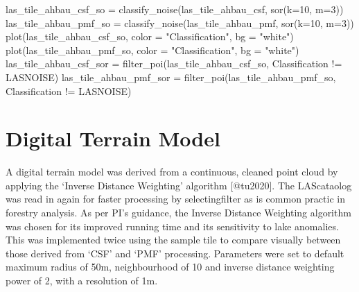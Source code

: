 \documentclass[
]{article}
\newenvironment{Shaded}{\begin{snugshade}}{\end{snugshade}}
\newcommand{\AttributeTok}[1]{\textcolor[rgb]{0.77,0.63,0.00}{#1}}
\newcommand{\DecValTok}[1]{\textcolor[rgb]{0.00,0.00,0.81}{#1}}
\newcommand{\FunctionTok}[1]{\textcolor[rgb]{0.00,0.00,0.00}{#1}}
\newcommand{\NormalTok}[1]{#1}
\newcommand{\OtherTok}[1]{\textcolor[rgb]{0.56,0.35,0.01}{#1}}
\newcommand{\SpecialCharTok}[1]{\textcolor[rgb]{0.00,0.00,0.00}{#1}}
\newcommand{\StringTok}[1]{\textcolor[rgb]{0.31,0.60,0.02}{#1}}
\begin{document}
\begin{Shaded}
\begin{Highlighting}[]
\NormalTok{las\_tile\_ahbau\_csf\_so }\OtherTok{=} \FunctionTok{classify\_noise}\NormalTok{(las\_tile\_ahbau\_csf, }\FunctionTok{sor}\NormalTok{(}\AttributeTok{k=}\DecValTok{10}\NormalTok{, }\AttributeTok{m=}\DecValTok{3}\NormalTok{))}
\NormalTok{las\_tile\_ahbau\_pmf\_so }\OtherTok{=} \FunctionTok{classify\_noise}\NormalTok{(las\_tile\_ahbau\_pmf, }\FunctionTok{sor}\NormalTok{(}\AttributeTok{k=}\DecValTok{10}\NormalTok{, }\AttributeTok{m=}\DecValTok{3}\NormalTok{))}
\FunctionTok{plot}\NormalTok{(las\_tile\_ahbau\_csf\_so, }\AttributeTok{color =} \StringTok{"Classification"}\NormalTok{, }\AttributeTok{bg =} \StringTok{"white"}\NormalTok{) }
\FunctionTok{plot}\NormalTok{(las\_tile\_ahbau\_pmf\_so, }\AttributeTok{color =} \StringTok{"Classification"}\NormalTok{, }\AttributeTok{bg =} \StringTok{"white"}\NormalTok{) }
\NormalTok{las\_tile\_ahbau\_csf\_sor }\OtherTok{=} \FunctionTok{filter\_poi}\NormalTok{(las\_tile\_ahbau\_csf\_so, Classification }\SpecialCharTok{!=}\NormalTok{ LASNOISE)}
\NormalTok{las\_tile\_ahbau\_pmf\_sor }\OtherTok{=} \FunctionTok{filter\_poi}\NormalTok{(las\_tile\_ahbau\_pmf\_so, Classification }\SpecialCharTok{!=}\NormalTok{ LASNOISE)}
\end{Highlighting}
\end{Shaded}

\hypertarget{digital-terrain-model}{%
\section{Digital Terrain Model}\label{digital-terrain-model}}

A digital terrain model was derived from a continuous, cleaned point
cloud by applying the `Inverse Distance Weighting' algorithm
{[}@tu2020{]}. The LAScataolog was read in again for faster processing
by selectingfilter as is common practic in forestry analysis. As per
PI's guidance, the Inverse Distance Weighting algorithm was chosen for
its improved running time and its sensitivity to lake anomalies. This
was implemented twice using the sample tile to compare visually between
those derived from `CSF' and `PMF' processing. Parameters were set to
default maximum radius of 50m, neighbourhood of 10 and inverse distance
weighting power of 2, with a resolution of 1m.
\end{document}

